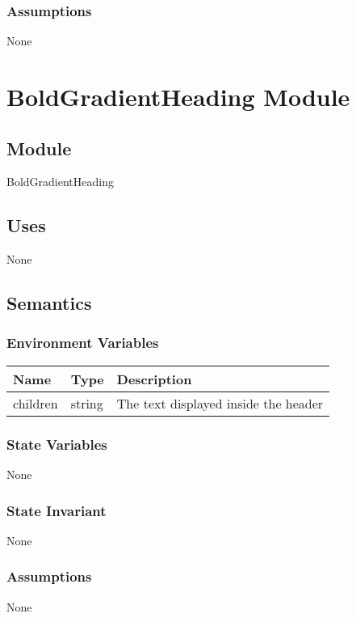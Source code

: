 \documentclass[12pt]{article}
\begin{document}
\subsubsection{Assumptions}
None

\newpage



\section{BoldGradientHeading Module}

\subsection{Module}
BoldGradientHeading

\subsection{Uses}
None

\subsection{Semantics}

\subsubsection{Environment Variables}
\begin{tabular}{| l | l | p{10cm} |}
    \hline
    \textbf{Name} & \textbf{Type} & \textbf{Description}\\ \hline
    children & string & The text displayed inside the header\\ \hline
\end{tabular}

\subsubsection{State Variables}
None

\subsubsection{State Invariant}
None

\subsubsection{Assumptions}
None

\newpage
\end{document}
